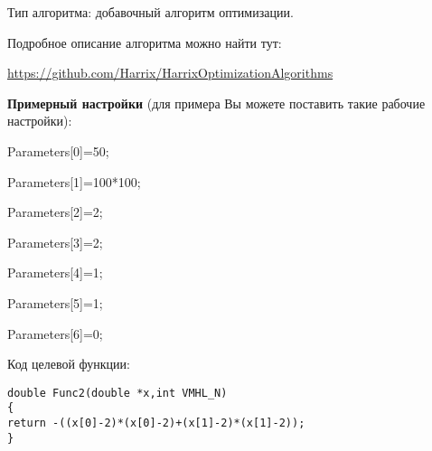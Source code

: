 \documentclass[a4paper,12pt]{article}
\begin{document}
Тип алгоритма: добавочный алгоритм оптимизации.

Подробное описание алгоритма можно найти тут:

\href{https://github.com/Harrix/HarrixOptimizationAlgorithms/blob/master/\_HarrixOptimizationAlgorithms.pdf}{https://github.com/Harrix/HarrixOptimizationAlgorithms}

\textbf{Примерный настройки} (для примера Вы можете поставить такие рабочие настройки):

 Parameters[0]=50;
 
Parameters[1]=100*100;

Parameters[2]=2;

Parameters[3]=2;

Parameters[4]=1;

Parameters[5]=1;

Parameters[6]=0;

Код целевой функции:
\begin{lstlisting}[caption=Оптимизируемая функция]
double Func2(double *x,int VMHL_N)
{
return -((x[0]-2)*(x[0]-2)+(x[1]-2)*(x[1]-2));
}
\end{lstlisting}
\end{document}
